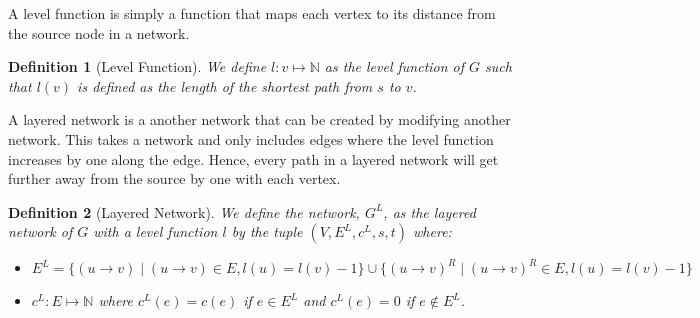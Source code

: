 \documentclass{report}
\newtheorem{definition}{Definition}[section]
\begin{document}
A level function is simply a function that maps each vertex to its distance from the source node in a network.
\begin{definition}[Level Function]
    We define $l: v \mapsto \mathbb{N}$ as the level function of $G$ such that $l(v)$ is defined as the length of the shortest path from $s$ to $v$.
\end{definition}

A layered network is a another network that can be created by modifying another network. This takes a network and only includes edges where the level function increases by one along the edge. Hence, every path in a layered network will get further away from the source by one with each vertex.
\begin{definition}[Layered Network]
    We define the network, $G^L$, as the layered network of $G$ with a level function $l$ by the tuple $(V, E^L, c^L, s, t)$ where:
    \begin{itemize}
        \item
            $$E^L = \{(u \rightarrow v) \mid (u \rightarrow v) \in E, l(u) = l(v) - 1\} \cup \{(u \rightarrow v)^R \mid (u \rightarrow v)^R \in E, l(u) = l(v) - 1\}$$
        \item
            $c^L : E \mapsto \mathbb{N}$ where $c^L(e) = c(e)$ if $e \in E^L$ and $c^L(e) = 0$ if $e \not\in E^L$.
    \end{itemize}
\end{definition}
\end{document}
